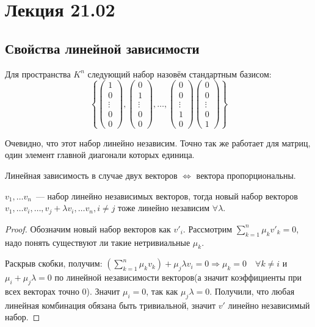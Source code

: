 \section{Лекция 21.02}\label{2}
\subsection{Свойства линейной зависимости}
\begin{definition}
    Для пространства $K^n$ следующий набор назовём стандартным
    базисом: $$
    \left\{
    \begin{pmatrix}
    1\\ 0\\ \vdots\\ 0\\ 0
    \end{pmatrix},
    \begin{pmatrix}
    0\\ 1\\ \vdots \\0 \\0
    \end{pmatrix}
    ,\dots,
    \begin{pmatrix}
    0\\ 0\\ \vdots \\1 \\0
    \end{pmatrix}
    \begin{pmatrix}
    0\\ 0\\ \vdots \\0 \\1
    \end{pmatrix}\right\}$$
\end{definition}
\begin{remark}
    Очевидно, что этот набор линейно независим.
    Точно так же работает для матриц, один элемент главной диагонали которых единица.
\end{remark}
\begin{remark}
    Линейная зависимость в случае двух векторов $\Leftrightarrow$ вектора пропорциональны.
\end{remark}
\begin{lemma}
    $v_1,\dots v_n$~--- набор линейно независимых векторов, тогда новый набор векторов
    $v_1, \dots v_i, \dots, v_j + \lambda v_i, \dots v_n, i\not=j$ тоже линейно независим $\forall \lambda$.
\end{lemma}
\begin{proof}
    Обозначим новый набор векторов как $v'_i$.
    Рассмотрим $\sum_{k = 1}^{n}\mu_k v'_k = 0$, надо понять существуют ли такие нетривиальные $\mu_k$.

    Раскрыв скобки, получим:
    $\left(\sum\limits_{k=1}^{n}\mu_kv_k\right) + \mu_j\lambda v_i = 0 \Rightarrow \mu_k=0\quad\forall k\not=i$ и $\mu_i + \mu_j \lambda = 0$
    по линейной независимости векторов(а значит коэффициенты при всех векторах точно 0).
    Значит $\mu_i=0$, так как $\mu_j\lambda= 0$. Получили, что любая линейная комбинация
    обязана быть тривиальной, значит $v'$ линейно независимый набор.
\end{proof}
